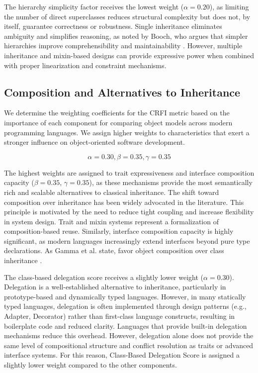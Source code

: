 The hierarchy simplicity factor receives the lowest weight ($\alpha = 0.20$), as limiting the number of direct superclasses reduces structural complexity but does not, by itself, guarantee correctness or robustness. Single inheritance eliminates ambiguity and simplifies reasoning, as noted by Booch, who argues that simpler hierarchies improve comprehensibility and maintainability \cite{booch2008object}. However, multiple inheritance and mixin-based designs can provide expressive power when combined with proper linearization and constraint mechanisms.

\subsection{Composition and Alternatives to Inheritance}

We determine the weighting coefficients for the CRFI metric based on the importance of each component for comparing object models across modern programming languages. We assign higher weights to characteristics that exert a stronger influence on object-oriented software development.

\[
\alpha = 0.30, \beta = 0.35, \gamma = 0.35
\]

The highest weights are assigned to trait expressiveness and interface composition capacity ($\beta = 0.35$, $\gamma = 0.35$), as these mechanisms provide the most semantically rich and scalable alternatives to classical inheritance. The shift toward composition over inheritance has been widely advocated in the literature. This principle is motivated by the need to reduce tight coupling and increase flexibility in system design. Trait and mixin systems represent a formalization of composition-based reuse. Similarly, interface composition capacity is highly significant, as modern languages increasingly extend interfaces beyond pure type declarations. 
As Gamma et al. state, favor object composition over class inheritance \cite{gamma1995design}.

The class-based delegation score receives a slightly lower weight ($\alpha = 0.30$). Delegation is a well-established alternative to inheritance, particularly in prototype-based and dynamically typed languages. However, in many statically typed languages, delegation is often implemented through design patterns (e.g., Adapter, Decorator) rather than first-class language constructs, resulting in boilerplate code and reduced clarity. Languages that provide built-in delegation mechanisms reduce this overhead. However, delegation alone does not provide the same level of compositional structure and conflict resolution as traits or advanced interface systems. For this reason, Class-Based Delegation Score is assigned a slightly lower weight compared to the other components.

